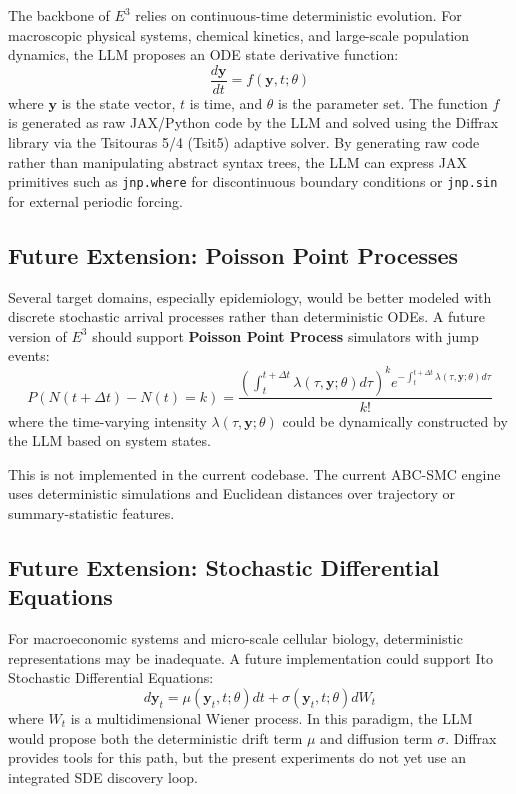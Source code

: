 The backbone of $E^3$ relies on continuous-time deterministic evolution. For macroscopic physical systems, chemical kinetics, and large-scale population dynamics, the LLM proposes an ODE state derivative function:
\begin{equation}
    \frac{d\mathbf{y}}{dt} = f(\mathbf{y}, t; \theta)
\end{equation}
where $\mathbf{y}$ is the state vector, $t$ is time, and $\theta$ is the parameter set. The function $f$ is generated as raw JAX/Python code by the LLM and solved using the Diffrax library via the Tsitouras 5/4 (Tsit5) adaptive solver. By generating raw code rather than manipulating abstract syntax trees, the LLM can express JAX primitives such as \texttt{jnp.where} for discontinuous boundary conditions or \texttt{jnp.sin} for external periodic forcing.

\subsection{Future Extension: Poisson Point Processes}
Several target domains, especially epidemiology, would be better modeled with discrete stochastic arrival processes rather than deterministic ODEs. A future version of $E^3$ should support \textbf{Poisson Point Process} simulators with jump events:
\begin{equation}
    P(N(t + \Delta t) - N(t) = k) = \frac{(\int_t^{t+\Delta t} \lambda(\tau, \mathbf{y}; \theta) d\tau)^k e^{-\int_t^{t+\Delta t} \lambda(\tau, \mathbf{y}; \theta) d\tau}}{k!}
\end{equation}
where the time-varying intensity $\lambda(\tau, \mathbf{y}; \theta)$ could be dynamically constructed by the LLM based on system states.

This is not implemented in the current codebase. The current ABC-SMC engine uses deterministic simulations and Euclidean distances over trajectory or summary-statistic features.

\subsection{Future Extension: Stochastic Differential Equations}
For macroeconomic systems and micro-scale cellular biology, deterministic representations may be inadequate. A future implementation could support Ito Stochastic Differential Equations:
\begin{equation}
    d\mathbf{y}_t = \mu(\mathbf{y}_t, t; \theta)dt + \sigma(\mathbf{y}_t, t; \theta)dW_t
\end{equation}
where $W_t$ is a multidimensional Wiener process. In this paradigm, the LLM would propose both the deterministic drift term $\mu$ and diffusion term $\sigma$. Diffrax provides tools for this path, but the present experiments do not yet use an integrated SDE discovery loop.
